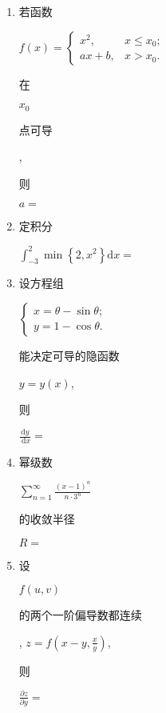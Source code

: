 \documentclass[10pt]{article}
\begin{document}
\begin{enumerate}
  \item \begin{CJK}{UTF8}{mj}若函数\end{CJK} $f(x)=\left\{\begin{array}{ll}x^{2}, & x \leqslant x_{0} ; \\ a x+b, & x>x_{0} .\end{array}\right.$ \begin{CJK}{UTF8}{mj}在\end{CJK} $x_{0}$ \begin{CJK}{UTF8}{mj}点可导\end{CJK}, \begin{CJK}{UTF8}{mj}则\end{CJK} $a=$

  \item \begin{CJK}{UTF8}{mj}定积分\end{CJK} $\int_{-3}^{2} \min \left\{2, x^{2}\right\} \mathrm{d} x=$

  \item \begin{CJK}{UTF8}{mj}设方程组\end{CJK} $\left\{\begin{array}{l}x=\theta-\sin \theta ; \\ y=1-\cos \theta .\end{array}\right.$ \begin{CJK}{UTF8}{mj}能决定可导的隐函数\end{CJK} $y=y(x)$, \begin{CJK}{UTF8}{mj}则\end{CJK} $\frac{\mathrm{d} y}{\mathrm{~d} x}=$

  \item \begin{CJK}{UTF8}{mj}幂级数\end{CJK} $\sum_{n=1}^{\infty} \frac{(x-1)^{n}}{n \cdot 3^{n}}$ \begin{CJK}{UTF8}{mj}的收敛半径\end{CJK} $R=$

  \item \begin{CJK}{UTF8}{mj}设\end{CJK} $f(u, v)$ \begin{CJK}{UTF8}{mj}的两个一阶偏导数都连续\end{CJK}, $z=f\left(x-y, \frac{x}{y}\right)$, \begin{CJK}{UTF8}{mj}则\end{CJK} $\frac{\partial z}{\partial y}=$


\end{enumerate}
\end{document}
